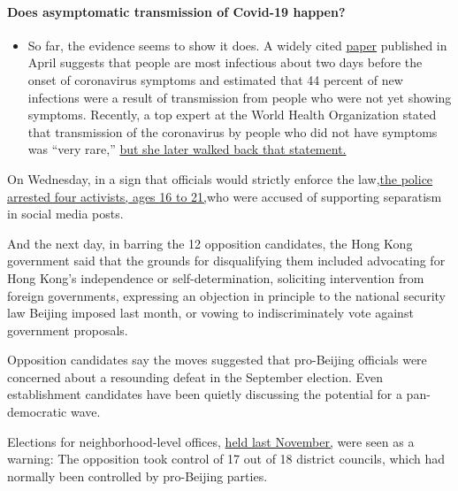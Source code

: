 \begin{itemize}
{  \paragraph{Does asymptomatic transmission of Covid-19
  happen?}\label{does-asymptomatic-transmission-of-covid-19-happen}}

  \begin{itemize}
  \tightlist
  \item
    So far, the evidence seems to show it does. A widely cited
    \href{https://www.nature.com/articles/s41591-020-0869-5}{paper}
    published in April suggests that people are most infectious about
    two days before the onset of coronavirus symptoms and estimated that
    44 percent of new infections were a result of transmission from
    people who were not yet showing symptoms. Recently, a top expert at
    the World Health Organization stated that transmission of the
    coronavirus by people who did not have symptoms was ``very rare,''
    \href{https://www.nytimes3xbfgragh.onion/2020/06/09/world/coronavirus-updates.html?action=click\&pgtype=Article\&state=default\&region=MAIN_CONTENT_3\&context=storylines_faq\#link-1f302e21}{but
    she later walked back that statement.}
  \end{itemize}
\end{itemize}

On Wednesday, in a sign that officials would strictly enforce the
law,\href{https://www.nytimes3xbfgragh.onion/2020/07/29/world/asia/hong-kong-arrests-security-law.html}{the
police arrested four activists, ages 16 to 21,}who were accused of
supporting separatism in social media posts.

And the next day, in barring the 12 opposition candidates, the Hong Kong
government said that the grounds for disqualifying them included
advocating for Hong Kong's independence or self-determination,
soliciting intervention from foreign governments, expressing an
objection in principle to the national security law Beijing imposed last
month, or vowing to indiscriminately vote against government proposals.

Opposition candidates say the moves suggested that pro-Beijing officials
were concerned about a resounding defeat in the September election. Even
establishment candidates have been quietly discussing the potential for
a pan-democratic wave.

Elections for neighborhood-level offices,
\href{https://www.nytimes3xbfgragh.onion/2019/11/24/world/asia/hong-kong-election-results.html}{held
last November,} were seen as a warning: The opposition took control of
17 out of 18 district councils, which had normally been controlled by
pro-Beijing parties.

